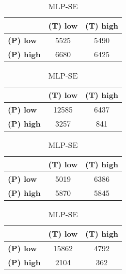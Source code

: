 \begin{landscape}
\begin{table}[htbp]
\centering
\begin{minipage}{.3\textwidth}
\tiny
\caption*{MLP-AP}
\begin{tabular}{|l|c|c|}
\hline
          & \textbf{(T) low}  & \textbf{(T) high} \\ \hline
\textbf{(P) low}  & 5525        & 5490        \\ \hline
\textbf{(P) high} & 6680        & 6425        \\ \hline
\end{tabular}
\end{minipage}\hfill
\begin{minipage}{.3\textwidth}
\tiny
\caption*{MLP-AT}
\begin{tabular}{|l|c|c|}
\hline
          & \textbf{(T) low}  & \textbf{(T) high} \\ \hline
\textbf{(P) low}  & 12585       & 6437        \\ \hline
\textbf{(P) high} & 3257        & 841       \\ \hline
\end{tabular}
\end{minipage}\hfill
\begin{minipage}{.3\textwidth}
\tiny
\caption*{MLP-PL}
\begin{tabular}{|l|c|c|}
\hline
          & \textbf{(T) low}  & \textbf{(T) high} \\ \hline
\textbf{(P) low}  & 5019        & 6386        \\ \hline
\textbf{(P) high} & 5870        & 5845        \\ \hline
\end{tabular}
\end{minipage}\hfill
\begin{minipage}{.3\textwidth}
\tiny
\caption*{MLP-SE}
\begin{tabular}{|l|c|c|}
\hline
          & \textbf{(T) low}  & \textbf{(T) high} \\ \hline
\textbf{(P) low}  & 15862       & 4792        \\ \hline
\textbf{(P) high} & 2104        & 362       \\ \hline
\end{tabular}
\end{minipage}\hfill
\end{table}
\end{landscape}